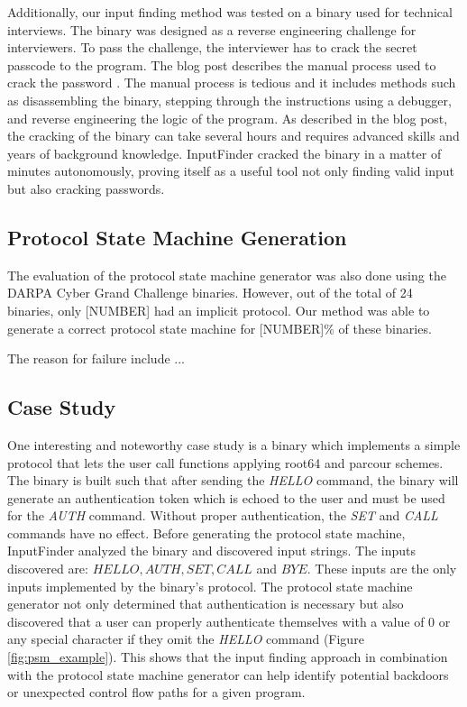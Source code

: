 \documentclass{acm_proc_article-sp}
\def \tool {InputFinder}
\def \numbinaries {24}
\begin{document}

Additionally, our input finding method was tested on a binary used for technical interviews.
The binary was designed as a reverse engineering challenge for interviewers.
To pass the challenge, the interviewer has to crack the secret passcode to the program.
The blog post describes the manual process used to crack the password \cite{interviewbinary}.
The manual process is tedious and it includes methods such as disassembling the binary, stepping through the instructions using a debugger, and reverse engineering the logic of the program.
As described in the blog post, the cracking of the binary can take several hours and requires advanced skills and years of background knowledge.
\tool{} cracked the binary in a matter of minutes autonomously, proving itself as a useful tool not only finding valid input but also cracking passwords.

\subsection{Protocol State Machine Generation}
The evaluation of the protocol state machine generator was also done using the DARPA Cyber Grand Challenge binaries.
However, out of the total of \numbinaries{} binaries, only [NUMBER] had an implicit protocol.
Our method was able to generate a correct protocol state machine for [NUMBER]\% of these binaries.

The reason for failure include ...

\subsection{Case Study}
One interesting and noteworthy case study is a binary which implements a simple protocol that lets the user call functions applying root64 and parcour schemes.
The binary is built such that after sending the \textit{HELLO} command, the binary will generate an authentication token which is echoed to the user and must be used for the \textit{AUTH} command.
Without proper authentication, the \textit{SET} and \textit{CALL} commands have no effect.
Before generating the protocol state machine, \tool{} analyzed the binary and discovered input strings.
The inputs discovered are: $HELLO, AUTH, SET, CALL$ and $BYE$.
These inputs are the only inputs implemented by the binary's protocol.
The protocol state machine generator not only determined that authentication is necessary but also discovered that a user can properly authenticate themselves with a value of 0 or any special character if they omit the \textit{HELLO} command (Figure \ref{fig:psm_example}).
This shows that the input finding approach in combination with the protocol state machine generator can help identify potential backdoors or unexpected control flow paths for a given program.
\end{document}
